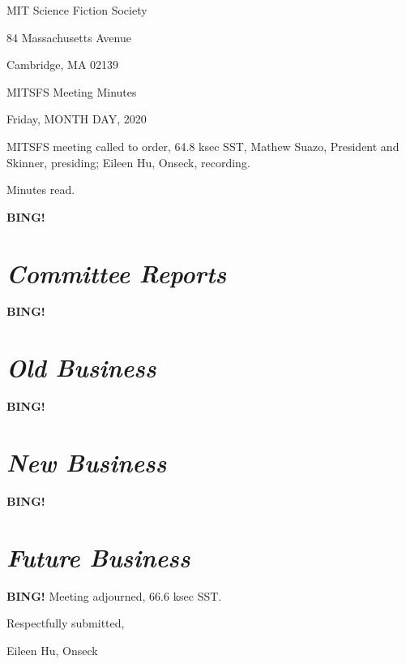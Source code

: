 \documentclass[10pt]{article}
\newcommand{\bing}{{\bf BING!} }
\newcommand{\goto}[1]{\bing \vskip 12pt \section*{{\em{#1}}}}
\newcommand{\skinner}{Mathew Suazo, President and Skinner\xspace}
\newcommand{\onseck}{Eileen Hu, Onseck\xspace}
\newcommand{\meetingdate}{Friday, MONTH DAY, 2020}
\begin{document}
\begin{center}

MIT Science Fiction Society

84 Massachusetts Avenue

Cambridge, MA 02139

\vspace{12pt}

MITSFS Meeting Minutes

\meetingdate

\end{center}

\vspace{18pt}

\setlength{\parskip}{6pt}

\noindent
MITSFS meeting called to order, 64.8 ksec SST,
\skinner, presiding; \onseck, recording.

Minutes read.

\goto{Committee Reports}

\goto{Old Business}

\goto{New Business}

\goto{Future Business}

\bing
\noindent
Meeting adjourned, 66.6 ksec SST.

\vspace{18pt}

\centerline{Respectfully submitted,}
\centerline{\onseck}
\end{document}
